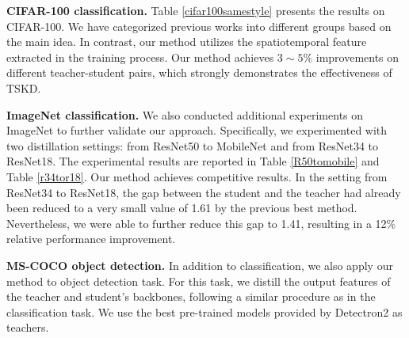 \documentclass[letterpaper]{article} %
\begin{document}
\noindent\textbf{CIFAR-100 classification.} Table \ref{cifar100samestyle} presents the results on CIFAR-100. We have categorized previous works into different groups based on the main idea. In contrast, our method utilizes the spatiotemporal feature extracted in the training process. Our method achieves $3 \sim 5\%$ improvements on different teacher-student pairs, which strongly demonstrates the effectiveness of TSKD.

\noindent\textbf{ImageNet classification.} We also conducted additional experiments on ImageNet to further validate our approach. Specifically, we experimented with two distillation settings: from ResNet50 to MobileNet and from ResNet34 to ResNet18. The experimental results are reported in Table \ref{R50tomobile} and Table \ref{r34tor18}. Our method achieves competitive results. In the setting from ResNet34 to ResNet18, the gap between the student and the teacher had already been reduced to a very small value of 1.61 by the previous best method. Nevertheless, we were able to further reduce this gap to 1.41, resulting in a 12\% relative performance improvement.

\noindent\textbf{MS-COCO object detection.} In addition to classification, we also apply our method to object detection task. For this task, we distill the output features of the teacher and student's backbones, following a similar procedure as in the classification task. We use the best pre-trained models provided by Detectron2 as teachers.
\end{document}
